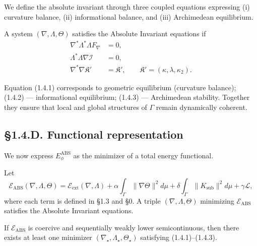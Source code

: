 We define the absolute invariant through three coupled equations expressing (i) curvature balance, (ii) informational balance, and (iii) Archimedean equilibrium.

\begin{definition}
A system $(\nabla,\Lambda,\Theta)$ satisfies the Absolute Invariant equations if
\begin{align}
\nabla^\ast \Lambda^\ast \Lambda F_\nabla &= 0, \tag{1.4.1}\\
\Lambda^\ast \Lambda \nabla \mathcal I &= 0, \tag{1.4.2}\\
\nabla^\ast\nabla\mathfrak K' &= \mathfrak K', \qquad 
\mathfrak K'=(\kappa,\lambda,\kappa_2). \tag{1.4.3}
\end{align}
\end{definition}

\begin{remark}
Equation (1.4.1) corresponds to geometric equilibrium (curvature balance);
(1.4.2) — informational equilibrium; 
(1.4.3) — Archimedean stability.
Together they ensure that local and global structures of $\Gamma$ remain dynamically coherent.
\end{remark}

\subsection*{§1.4.D. Functional representation}

We now express $E_\phi^{\mathrm{ABS}}$ as the minimizer of a total energy functional.

\begin{definition}
Let
\[
\mathcal{E}_{\mathrm{ABS}}(\nabla,\Lambda,\Theta)
=\mathcal{E}_{\mathrm{ext}}(\nabla,\Lambda)
+\alpha \int_\Gamma \|\nabla\Theta\|^2 d\mu
+\delta \int_\Gamma \|K_{\mathrm{sub}}\|^2 d\mu
+\gamma \mathcal L,
\]
where each term is defined in §1.3 and §0.  
A triple $(\nabla,\Lambda,\Theta)$ minimizing $\mathcal{E}_{\mathrm{ABS}}$ satisfies the Absolute Invariant equations.
\end{definition}

\begin{theorem}\label{thm:1.4.exist}
If $\mathcal E_{\mathrm{ABS}}$ is coercive and sequentially weakly lower semicontinuous, then there exists at least one minimizer 
$(\nabla_\star,\Lambda_\star,\Theta_\star)$ satisfying (1.4.1)–(1.4.3).
\end{theorem}

